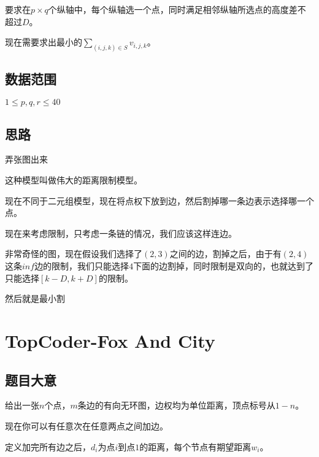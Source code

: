 \documentclass{ctexart}
\numberwithin{equation}{section}
\begin{document}
\begin{flushleft}
  要求在$p\times q$个纵轴中，每个纵轴选一个点，同时满足相邻纵轴所选点的高度差不超过$D$。

  现在需要求出最小的$\sum\limits_{(i,j,k)\in S} v_{i,j,k}$。
  
    
  \subsection{数据范围}
  $1\le p,q,r \le 40$
  \subsection{思路}
  弄张图出来
  
  \begin{figure}[htb]
  \end{figure}
  
  这种模型叫做伟大的距离限制模型。

  现在不同于二元组模型，现在将点权下放到边，然后割掉哪一条边表示选择哪一个点。

  \newpage
  
  现在来考虑限制，只考虑一条链的情况，我们应该这样连边。
  
  \begin{figure}[htb]
  \end{figure}

  非常奇怪的图，现在假设我们选择了$(2,3)$之间的边，割掉之后，由于有$(2,4)$这条$inf$边的限制，我们只能选择$4$下面的边割掉，同时限制是双向的，也就达到了只能选择$[k-D,k+D]$的限制。

  然后就是最小割

  \newpage

  \section{TopCoder-Fox And City}
  \subsection{题目大意}
  给出一张$n$个点，$m$条边的有向无环图，边权均为单位距离，顶点标号从$1-n$。

  现在你可以有任意次在任意两点之间加边。
  
  定义加完所有边之后，$d_i$为点$i$到点$1$的距离，每个节点有期望距离$w_i$。


\end{flushleft}
\end{document}
